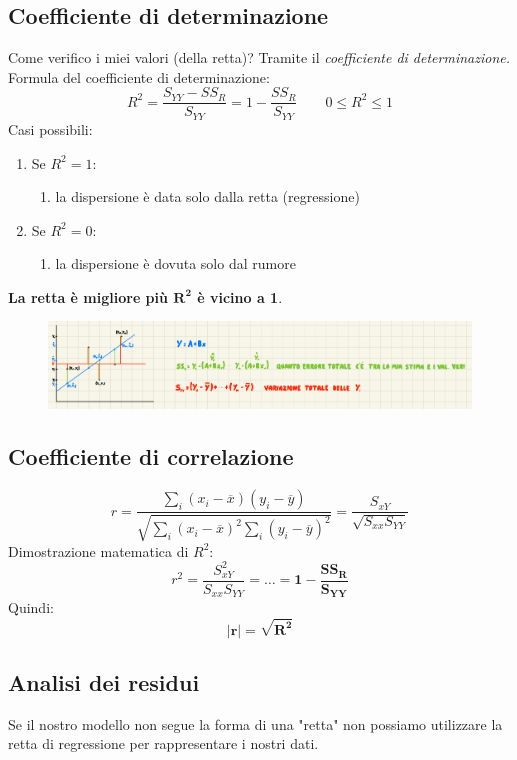 \documentclass[]{article}
\begin{document}
    \subsection{Coefficiente di determinazione}
    Come verifico i miei valori (della retta)? Tramite il \textit{coefficiente di determinazione.}
    Formula del coefficiente di determinazione:
    \[ R^2 = \frac{S_{YY}-SS_R}{S_{YY}} = 1- \frac{SS_R}{S_{YY}} \quad  \quad 0 \leq R^2 \leq 1 \]
    Casi possibili:
    \begin{enumerate}
        \item Se $R^2 = 1$:
        \begin{enumerate}
            \item la dispersione è data solo dalla retta (regressione)
        \end{enumerate}
        \item Se $R^2 = 0$:
        \begin{enumerate}
            \item la dispersione è dovuta solo dal rumore
        \end{enumerate}
    \end{enumerate}
    \textbf{La retta è migliore più $\boldsymbol{R^2}$ è vicino a 1}.
    \begin{figure}[H]
        \includegraphics[width=\textwidth]{images/boh_14.png}
    \end{figure}
    \subsection{Coefficiente di correlazione}
    \[ r = \frac{\sum_i (x_i - \overline x)(y_i - \overline y)}{\sqrt{\sum_i (x_i - \overline x)^2 \sum_i(y_i - \overline y)^2}} = \frac{S_{xY}}{\sqrt{S_{xx}S_{YY}}} \]
    Dimostrazione matematica di $R^2$:
    \[ r^2 = \frac{S_{xY}^2}{S_{xx}S_{YY}} = \ldots = \boldsymbol{1- \frac{SS_R}{S_{YY}}} \]
    Quindi:
    \[ \boldsymbol{|r| = \sqrt{R^2}} \]
    \subsection{Analisi dei residui}
    Se il nostro modello non segue la forma di una "retta" non possiamo utilizzare la retta di regressione per rappresentare i nostri dati.
\end{document}
